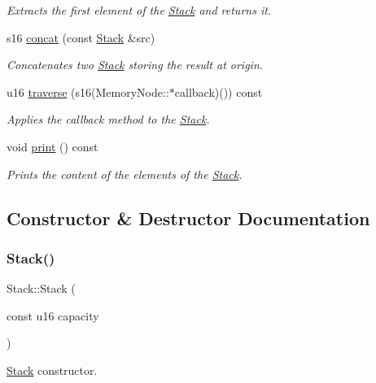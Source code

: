 \begin{DoxyCompactItemize}
\begin{DoxyCompactList}\small\item\em Extracts the first element of the \hyperlink{class_stack}{Stack} and returns it. \end{DoxyCompactList}\item 
s16 \hyperlink{class_stack_a43140f1be6fde2389b8fabde77d124c1}{concat} (const \hyperlink{class_stack}{Stack} \&src)
\begin{DoxyCompactList}\small\item\em Concatenates two \hyperlink{class_stack}{Stack} storing the result at origin. \end{DoxyCompactList}\item 
u16 \hyperlink{class_stack_a9b8f6f94beb016e0345e7c5ace28ab94}{traverse} (s16(Memory\+Node\+::$\ast$callback)()) const
\begin{DoxyCompactList}\small\item\em Applies the callback method to the \hyperlink{class_stack}{Stack}. \end{DoxyCompactList}\item 
void \hyperlink{class_stack_a93cbfa88863494b516670340d01358dd}{print} () const
\begin{DoxyCompactList}\small\item\em Prints the content of the elements of the \hyperlink{class_stack}{Stack}. \end{DoxyCompactList}\end{DoxyCompactItemize}


\subsection{Constructor \& Destructor Documentation}
\mbox{\label{class_stack_ae208bce3b329f0dc82c8b7e761bb595e}} 
\subsubsection{\texorpdfstring{Stack()}{Stack()}\hspace{0.1cm}{\footnotesize\ttfamily [1/3]}}
{\footnotesize\ttfamily Stack\+::\+Stack (\begin{DoxyParamCaption}\item[{const u16}]{capacity }\end{DoxyParamCaption})}



\hyperlink{class_stack}{Stack} constructor. 

